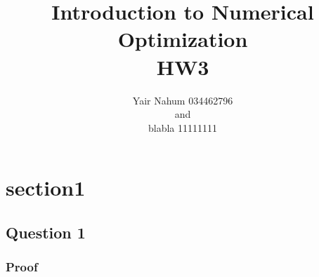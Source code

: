 \documentclass{article}
\title{Introduction to Numerical Optimization\\HW3}
\author{Yair Nahum 034462796\\and\\blabla 11111111 }
\begin{document}
\maketitle


\section{section1}

\subsection{Question 1}
\subsubsection*{Proof}
\end{document}
